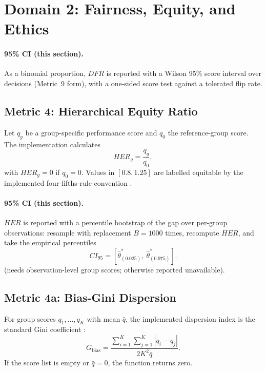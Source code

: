 \documentclass[11pt]{article}
\begin{document}
\section{Domain 2: Fairness, Equity, and Ethics}


\paragraph{95\% CI (this section).} As a binomial proportion, $DFR$ is reported with a Wilson 95\% score interval over decisions (Metric~9 form), with a one-sided score test against a tolerated flip rate.

\subsection{Metric 4: Hierarchical Equity Ratio}

Let $q_g$ be a group-specific performance score and $q_0$ the reference-group
score. The implementation calculates
\begin{equation}
HER_g = \frac{q_g}{q_0},
\end{equation}
with $HER_g=0$ if $q_0=0$. Values in $[0.8,1.25]$ are labelled equitable by the
implemented four-fifths-rule convention \cite{uniformguidelines1978}.


\paragraph{95\% CI (this section).} $HER$ is reported with a percentile bootstrap of the gap over per-group observations: resample with replacement $B=1000$ times, recompute $HER$, and take the empirical percentiles
\begin{equation}
CI_{95}=\left[\hat\theta^{\ast}_{(0.025)},\ \hat\theta^{\ast}_{(0.975)}\right].
\end{equation} (needs observation-level group scores; otherwise reported unavailable).

\subsection{Metric 4a: Bias-Gini Dispersion}

For group scores $q_1,\ldots,q_K$ with mean $\bar q$, the implemented dispersion
index is the standard Gini coefficient \cite{gini1912}:
\begin{equation}
G_{\mathrm{bias}}=
\frac{\sum_{i=1}^{K}\sum_{j=1}^{K}|q_i-q_j|}
{2K^2\bar q}.
\end{equation}
If the score list is empty or $\bar q=0$, the function returns zero.
\end{document}
